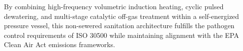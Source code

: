 \documentclass[10pt,twocolumn,a4paper]{article}
\begin{document}
By combining high-frequency volumetric induction heating, cyclic pulsed dewatering, and multi-stage catalytic off-gas treatment within a self-energized pressure vessel, this non-sewered sanitation architecture fulfills the pathogen control requirements of ISO 30500 while maintaining alignment with the EPA Clean Air Act emissions frameworks.
\end{document}
